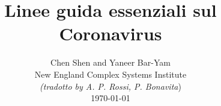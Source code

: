 \documentclass[onecolumn,journal]{IEEEtran}
\begin{document}
\title{\color{Brown} Linee guida essenziali sul Coronavirus \\
\vspace{-0.35ex}}
\author{Chen Shen and Yaneer Bar-Yam \\ New England Complex Systems Institute \\
\vspace{+0.35ex}
\small{\textit{(tradotto by A. P. Rossi, P. Bonavita})}\\
 \today
  \vspace{-14ex} \\


\bigskip
\bigskip

\textbf{}
 }

\maketitle


\flushbottom %



\thispagestyle{empty} %




\renewcommand{\thefootnote}{\fnsymbol{footnote}}
\end{document}
